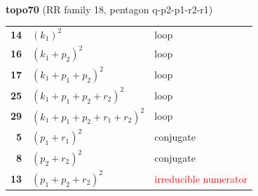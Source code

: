 \documentclass[10pt]{article}
\begin{document}
\begin{minipage}[t]{0.48\textwidth}
{}\\[2mm]\textbf{topo70} (RR family 18, pentagon q-p2-p1-r2-r1)\\[2pt]{\footnotesize\begin{tabular}{@{}r@{\ \ }l@{\ \ }l@{}}\textbf{14} & $(k_1)^2$ & loop\\
\textbf{16} & $(k_1+p_2)^2$ & loop\\
\textbf{17} & $(k_1+p_1+p_2)^2$ & loop\\
\textbf{25} & $(k_1+p_1+p_2+r_2)^2$ & loop\\
\textbf{29} & $(k_1+p_1+p_2+r_1+r_2)^2$ & loop\\
\textbf{5} & $(p_1+r_1)^2$ & conjugate\\
\textbf{8} & $(p_2+r_2)^2$ & conjugate\\
\textbf{13} & $(p_1+p_2+r_2)^2$ & \textcolor{red}{irreducible numerator}\\\end{tabular}}\end{minipage}

\bigskip
\end{document}
